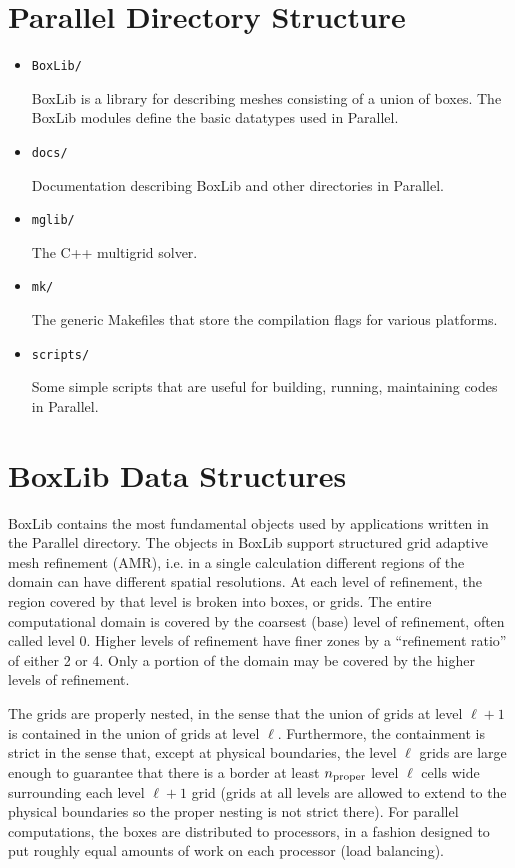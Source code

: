 \section{Parallel Directory Structure}

\begin{itemize}
\item {\tt BoxLib/} 

 BoxLib is a library for describing meshes consisting of a union
 of boxes.  The BoxLib modules define the basic datatypes used
 in Parallel.

\item {\tt docs/}

 Documentation describing BoxLib and other directories in Parallel.

\item {\tt mglib/}

  The C++ multigrid solver.

\item {\tt mk/}

  The generic Makefiles that store the compilation flags for
  various platforms.

\item {\tt scripts/}

  Some simple scripts that are useful for building, running,
  maintaining codes in Parallel.

\end{itemize}

\section{BoxLib Data Structures}

BoxLib contains the most fundamental objects used by applications written
in the Parallel directory. The objects in BoxLib support structured
grid adaptive mesh refinement (AMR), i.e. in a single calculation
different regions of the domain can have different spatial resolutions.  
At each level of refinement, the region covered by that level is broken
into boxes, or grids.  The entire computational domain is covered by
the coarsest (base) level of refinement, often called level 0. 
Higher levels of refinement have finer zones by a ``refinement ratio''
of either 2 or 4.  Only a portion of the domain may
be covered by the higher levels of refinement.  

The grids are properly nested, in the sense that the union of grids
at level $\ell+1$ is contained in the union of grids at level $\ell$.
Furthermore, the containment is strict in the sense that,
except at physical boundaries,
the level $\ell$ grids are large enough to guarantee that there is
a border at least $n_{\rm proper}$ level $\ell$ cells wide surrounding each level
$\ell +1$ grid (grids at all levels are allowed to extend to the physical
boundaries so the proper nesting is not strict there).
For parallel computations, the boxes are distributed to processors, in
a fashion designed to put roughly equal amounts of work on each
processor (load balancing).

